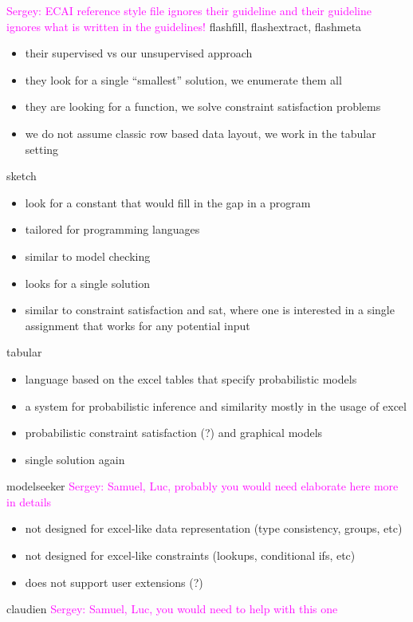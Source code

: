 \documentclass{ecai}
\newcommand{\sergey}[1]{\textcolor{magenta}{{\sc Sergey:} #1}\xspace}
\begin{document}
\sergey{ECAI reference style file ignores their guideline and their guideline ignores what is written in the guidelines!}
flashfill, flashextract, flashmeta \cite{flashfill,flashextract,flashmeta}
\begin{itemize}
  \item their supervised vs our unsupervised approach
  \item they look for a single ``smallest'' solution, we enumerate them all
  \item they are looking for a function, we solve constraint satisfaction problems
  \item we do not assume classic row based data layout, we work in the tabular setting
\end{itemize}

sketch \cite{sketch}
\begin{itemize}
  \item look for a constant that would fill in the gap in a program
  \item tailored for programming languages
  \item similar to model checking
  \item looks for a single solution
  \item similar to constraint satisfaction and sat, where one is interested in a single assignment that works for any potential input
\end{itemize}

tabular \cite{tabular}
\begin{itemize}
  \item language based on the excel tables that specify probabilistic models
  \item a system for probabilistic inference and similarity mostly in the usage of excel
  \item probabilistic constraint satisfaction (?) and graphical models
  \item single solution again
\end{itemize}

modelseeker \cite{modelseeker} \sergey{Samuel, Luc, probably you would need elaborate here more in details}

\begin{itemize}
  \item not designed for excel-like data representation (type consistency, groups, etc)
  \item not designed for excel-like constraints (lookups, conditional ifs, etc)
  \item does not support user extensions (?)
\end{itemize}

claudien \cite{claudien} \sergey{Samuel, Luc, you would need to help with this one}



\end{document}
